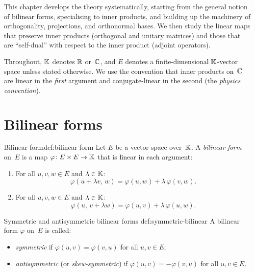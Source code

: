 This chapter develops the theory systematically, starting from the
general notion of bilinear forms, specialising to inner products, and
building up the machinery of orthogonality, projections, and
orthonormal bases.  We then study the linear maps that preserve inner
products (orthogonal and unitary matrices) and those that are
``self-dual'' with respect to the inner product (adjoint operators).

Throughout, ${\mathbb{K}}$ denotes ${\mathbb{R}}$ or~${\mathbb{C}}$, and $E$ denotes a
finite-dimensional ${\mathbb{K}}$-vector space unless stated otherwise.  We use
the convention that inner products on~${\mathbb{C}}$ are linear in the
\emph{first} argument and conjugate-linear in the second (the
\emph{physics convention}).


\section{Bilinear forms}\label{sec:bilinear-forms}

\begin{definition}{Bilinear form}{def:bilinear-form}
Let $E$ be a vector space over~${\mathbb{K}}$.  A \emph{bilinear form} on~$E$ is
a map $\varphi\colon E\times E \to {\mathbb{K}}$ that is linear in each argument:
\begin{enumerate}[label=(\roman*)]
  \item For all $u,v,w\in E$ and $\lambda\in{\mathbb{K}}$:
    \[
      \varphi(u+\lambda v,\, w) = \varphi(u,w) + \lambda\,\varphi(v,w).
    \]
  \item For all $u,v,w\in E$ and $\lambda\in{\mathbb{K}}$:
    \[
      \varphi(u,\, v+\lambda w) = \varphi(u,v) + \lambda\,\varphi(u,w).
    \]
\end{enumerate}
\end{definition}

\begin{definition}{Symmetric and antisymmetric bilinear forms}%
{def:symmetric-bilinear}
A bilinear form $\varphi$ on~$E$ is called:
\begin{itemize}
  \item \emph{symmetric} if $\varphi(u,v) = \varphi(v,u)$ for all
    $u,v\in E$;
  \item \emph{antisymmetric} (or \emph{skew-symmetric}) if
    $\varphi(u,v) = -\varphi(v,u)$ for all $u,v\in E$.
\end{itemize}
\end{definition}

